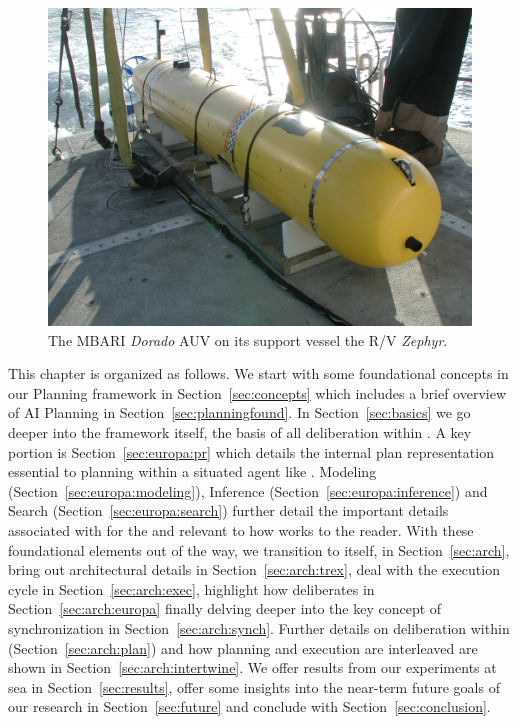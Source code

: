\begin{figure}[t]
  \centering \vskip-5pt
  \includegraphics[scale=0.1]{figs/MBARI-AUV.jpg}
  \caption{\small The MBARI \emph{Dorado} AUV on its support vessel
    the R/V \emph{Zephyr}.}
  \label{fig:auv-fig}
  \vskip-0.3cm
\end{figure}

This chapter is organized as follows. We start with some foundational
concepts in our Planning framework in Section~\ref{sec:concepts} which
includes a brief overview of AI Planning in
Section~\ref{sec:planningfound}. In Section~\ref{sec:basics} we go
deeper into the \eu framework itself, the basis of all deliberation
within \rx. A key portion is Section~\ref{sec:europa:pr} which details
the internal plan representation essential to planning within a
situated agent like \rx. Modeling (Section~\ref{sec:europa:modeling}),
Inference (Section~\ref{sec:europa:inference}) and Search
(Section~\ref{sec:europa:search}) further detail the important details
associated with \eu for the and relevant to how \rx works to the
reader. With these foundational elements out of the way, we transition
to \rx itself, in Section~\ref{sec:arch}, bring out architectural
details in Section~\ref{sec:arch:trex}, deal with the execution cycle
in Section~\ref{sec:arch:exec}, highlight how \rx deliberates in
Section~\ref{sec:arch:europa} finally delving deeper into the key
concept of synchronization in Section~\ref{sec:arch:synch}. Further
details on deliberation within \rx (Section~\ref{sec:arch:plan}) and
how planning and execution are interleaved are shown in
Section~\ref{sec:arch:intertwine}. We offer results from our
experiments at sea in Section~\ref{sec:results}, offer some insights
into the near-term future goals of our research in
Section~\ref{sec:future} and conclude with
Section~\ref{sec:conclusion}.

